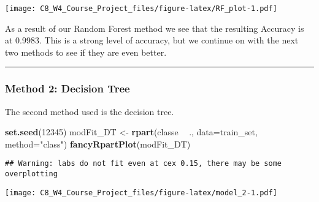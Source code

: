 \documentclass[]{article}
\newenvironment{Shaded}{\begin{snugshade}}{\end{snugshade}}
\newcommand{\KeywordTok}[1]{\textcolor[rgb]{0.13,0.29,0.53}{\textbf{#1}}}
\newcommand{\DataTypeTok}[1]{\textcolor[rgb]{0.13,0.29,0.53}{#1}}
\newcommand{\DecValTok}[1]{\textcolor[rgb]{0.00,0.00,0.81}{#1}}
\newcommand{\StringTok}[1]{\textcolor[rgb]{0.31,0.60,0.02}{#1}}
\newcommand{\CommentTok}[1]{\textcolor[rgb]{0.56,0.35,0.01}{\textit{#1}}}
\newcommand{\OperatorTok}[1]{\textcolor[rgb]{0.81,0.36,0.00}{\textbf{#1}}}
\newcommand{\NormalTok}[1]{#1}
\begin{document}
\begin{Shaded}
\end{Shaded}

\texttt{[image: C8\_W4\_Course\_Project\_files/figure-latex/RF\_plot-1.pdf]}

As a result of our Random Forest method we see that the resulting
Accuracy is at 0.9983. This is a strong level of accuracy, but we
continue on with the next two methods to see if they are even better.

\begin{center}\rule{0.5\linewidth}{\linethickness}\end{center}

\subsubsection{Method 2: Decision Tree}\label{method-2-decision-tree}

The second method used is the decision tree.

\begin{Shaded}
\begin{Highlighting}[]
\KeywordTok{set.seed}\NormalTok{(}\DecValTok{12345}\NormalTok{)}
\NormalTok{modFit_DT <-}\StringTok{ }\KeywordTok{rpart}\NormalTok{(classe }\OperatorTok{~}\StringTok{ }\NormalTok{., }\DataTypeTok{data=}\NormalTok{train_set, }\DataTypeTok{method=}\StringTok{"class"}\NormalTok{)}
\KeywordTok{fancyRpartPlot}\NormalTok{(modFit_DT)}
\end{Highlighting}
\end{Shaded}

\begin{verbatim}
## Warning: labs do not fit even at cex 0.15, there may be some overplotting
\end{verbatim}

\texttt{[image: C8\_W4\_Course\_Project\_files/figure-latex/model\_2-1.pdf]}

\begin{Shaded}
\end{Shaded}
\end{document}

